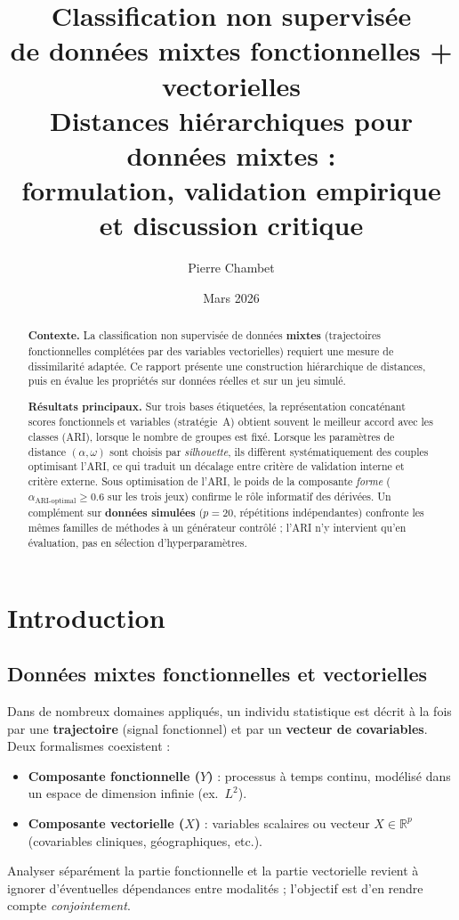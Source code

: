 \documentclass[11pt, a4paper]{article}
\title{%
  \vspace{-1cm}
  \textbf{Classification non supervisée} \\[0.3em]
  \textbf{de données mixtes fonctionnelles + vectorielles} \\[0.5em]
  \Large Distances hiérarchiques pour données mixtes : \\
  formulation, validation empirique et discussion critique
}
\author{Pierre Chambet}
\date{Mars 2026}
\begin{document}
\maketitle
\thispagestyle{fancy}

\begin{abstract}
\noindent
\textbf{Contexte.} La classification non supervisée de données \textbf{mixtes}
(trajectoires fonctionnelles complétées par des variables vectorielles)
requiert une mesure de dissimilarité adaptée. Ce rapport présente une
construction hiérarchique de distances, puis en évalue les propriétés sur
données réelles et sur un jeu simulé.

\textbf{Résultats principaux.} Sur trois bases étiquetées, la représentation
concaténant scores fonctionnels et variables (stratégie~A) obtient souvent le
meilleur accord avec les classes (ARI), lorsque le nombre de groupes est fixé.
Lorsque les paramètres de distance $(\alpha, \omega)$ sont choisis par
\emph{silhouette}, ils diffèrent systématiquement des couples optimisant l'ARI,
ce qui traduit un décalage entre critère de validation interne et critère
externe. Sous optimisation de l'ARI, le poids de la composante \emph{forme}
($\alpha_{\text{ARI-optimal}} \geq 0.6$ sur les trois jeux) confirme le rôle
informatif des dérivées. Un complément sur \textbf{données simulées}
($p = 20$, répétitions indépendantes) confronte les mêmes familles de méthodes
à un générateur contrôlé ; l'ARI n'y intervient qu'en évaluation, pas en
sélection d'hyperparamètres.

\end{abstract}
\vspace{0.75em}

\tableofcontents
\newpage

\section{Introduction}

\subsection{Données mixtes fonctionnelles et vectorielles}
Dans de nombreux domaines appliqués, un individu statistique est décrit à la
fois par une \textbf{trajectoire} (signal fonctionnel) et par un
\textbf{vecteur de covariables}. Deux formalismes coexistent :
\begin{itemize}
    \item \textbf{Composante fonctionnelle ($Y$)} : processus à temps continu,
    modélisé dans un espace de dimension infinie (ex.\ $L^2$).
    \item \textbf{Composante vectorielle ($X$)} : variables scalaires ou
    vecteur $X \in \mathbb{R}^p$ (covariables cliniques, géographiques, etc.).
\end{itemize}
Analyser séparément la partie fonctionnelle et la partie vectorielle revient
à ignorer d'éventuelles dépendances entre modalités ; l'objectif est d'en
rendre compte \textit{conjointement}.
\end{document}
